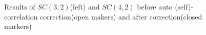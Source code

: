 	\begin{figure}[h]
		\begin{center}
        \label{SC42_autoC}
        \caption{Results of $SC(3,2)$(left) and $SC(4,2)$ before auto (self)-correlation correction(open makers) and after correction(closed markers)}
        \end{center}   
     \end{figure}




